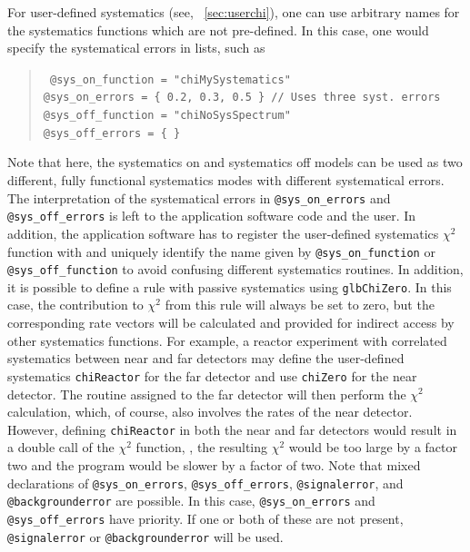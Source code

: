 For user-defined systematics 
(see, \Sec~\ref{sec:userchi}), one can use arbitrary names
for the systematics functions which are not pre-defined. In this case,
one would specify the systematical errors in lists, such as
\begin{quote}
{\tt
\tb @sys\_on\_function = "chiMySystematics"  \\
\tb @sys\_on\_errors = \{ 0.2, 0.3, 0.5 \}~// Uses three syst. errors \\
\tb @sys\_off\_function = "chiNoSysSpectrum"  \\
\tb @sys\_off\_errors = \{ \}
}
\end{quote}
Note that here, the systematics on and systematics off models can be used 
as two different, fully functional systematics modes with different systematical
errors. The interpretation of the systematical errors in {\tt @sys\_on\_errors} and
{\tt @sys\_off\_errors} is left to the application software code and the user.
In addition, the application software has to register the user-defined systematics $\chi^2$
function with  and uniquely identify the name
given by {\tt @sys\_on\_function} or {\tt @sys\_off\_function} to avoid
confusing different systematics routines. In addition, it is possible to define
a rule with passive systematics using {\tt glbChiZero}. In this case, the
contribution to $\chi^2$ from this rule will always be set to zero, but
the corresponding rate vectors will be calculated and provided for indirect access
by other systematics functions. For example, a reactor experiment with correlated
systematics between near and far detectors may define the user-defined systematics
{\tt chiReactor} for the far detector and use {\tt chiZero} for the near detector.
The routine assigned to the far detector will then perform the $\chi^2$ calculation,
which, of course, also involves the rates of the near detector. However, defining
{\tt chiReactor} in both the near and far detectors would result in a double call
of the $\chi^2$ function, \ie, the resulting $\chi^2$ would be too large by a factor two
and the program would be slower by a factor of two.
Note that mixed declarations of {\tt @sys\_on\_errors}, {\tt @sys\_off\_errors}, {\tt @signalerror}, and
{\tt @backgrounderror} are possible. In this case, {\tt @sys\_on\_errors} and {\tt @sys\_off\_errors}
have priority. If one or both of these are not present, {\tt @signalerror} or
{\tt @backgrounderror} will be used.

